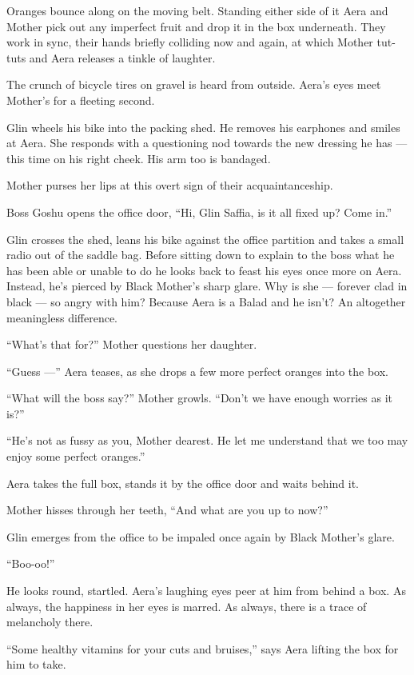 \documentclass[twoside,11pt,openany]{book}
\begin{document}
Oranges bounce along on the moving belt. Standing either side of it Aera and Mother pick out any imperfect fruit and
drop it in the box underneath. They work in sync, their hands briefly colliding now and again, at which Mother tut-tuts
and Aera releases a tinkle of laughter.

The crunch of bicycle tires on gravel is heard from outside. Aera's eyes meet Mother's for a fleeting second.

Glin wheels his bike into the packing shed. He removes his earphones and smiles at Aera. She responds with a questioning
nod towards the new dressing he has --- this time on his right cheek. His arm too is bandaged.

Mother purses her lips at this overt sign of their acquaintanceship.

Boss Goshu opens the office door, ``Hi, Glin Saffia, is it all fixed up? Come in.''

Glin crosses the shed, leans his bike against the office partition and takes a small radio out of the saddle bag. Before
sitting down to explain to the boss what he has been able or unable to do he looks back to feast his eyes once more on
Aera. Instead, he's pierced by Black Mother's sharp glare. Why is she --- forever clad in black --- so angry with him?
Because Aera is a Balad and he isn't? An altogether meaningless difference.

``What's that for?'' Mother questions her daughter.

``Guess ---'' Aera teases, as she drops a few more perfect oranges into the box.

``What will the boss say?'' Mother growls. ``Don't we have enough worries as it
is?''

``He's not as fussy as you, Mother dearest. He let me understand that we too may enjoy some perfect
oranges.''

Aera takes the full box, stands it by the office door and waits behind it.

Mother hisses through her teeth, ``And what are you up to now?''

Glin emerges from the office to be impaled once again
by Black \linebreak[4]Mother's glare.

``Boo-oo!''

He looks round, startled. Aera's laughing eyes peer at him from behind a box. As always, the happiness in her eyes is
marred. As always, there is a trace of melancholy there.

``Some healthy vitamins for your cuts and bruises,'' says Aera lifting the box for him to
take.
\end{document}
